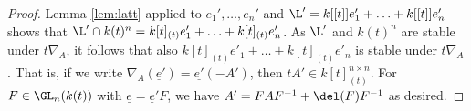 \documentclass[a4paper, 11pt]{article}
\begin{document}
\begin{proof}
	Lemma \ref{lem:latt} applied to $e_1',\ldots,e_n'$ and $\L'=k[[t]]e_1'+\ldots+k[[t]]e_n'$ shows that 
	$\L'\cap k(t)^n=k[t]_{(t)}e'_1+\ldots+k[t]_{(t)}e'_n$. As $\L'$ and $k(t)^n$ are stable under $t\nabla_A$, it follows that also $k[t]_{(t)}e'_1+\ldots+k[t]_{(t)}e'_n$ is stable under $t\nabla_A$. That is, if we write $\nabla_A(\underline{e}')=\underline{e'}(-A')$, then $tA'\in k[t]_{(t)}^{n\times n}$. For $F\in\GL_n(k(t))$ with $\underline{e}=\underline{e}'F$, we have $A'=FAF^{-1}+\del(F)F^{-1}$ as desired.
%	
%
%	
%	
%	
%	
%
\end{proof}	
\end{document}
